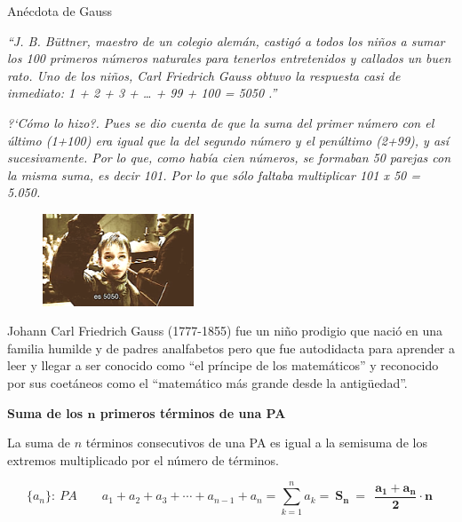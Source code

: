 \begin{myexampleblock}{Anécdota de Gauss}
\begin{multicols}{2}
\emph{``J. B. Büttner, maestro de un colegio alemán, castigó a todos los niños a sumar los 100 primeros números naturales para tenerlos entretenidos y callados un buen rato. Uno de los niños, Carl Friedrich Gauss obtuvo la respuesta casi de inmediato:  1 + 2 + 3 + … + 99 + 100  = 5050 .''}

\vspace{2mm} \emph{?`Cómo lo hizo?. Pues se dio cuenta de que la suma del primer número con el último (1+100) era igual que la del segundo número y el penúltimo (2+99), y así sucesivamente. Por lo que, como había cien números, se formaban 50 parejas con la misma suma, es decir 101. Por lo que sólo faltaba multiplicar 101 x 50 = 5.050.}

\begin{figure}[H]
	\centering
\includegraphics[width=0.4\textwidth]{img-suc/suc08.png}
	\end{figure}
\end{multicols}

\begin{small} \textsf{Johann Carl Friedrich Gauss (1777-1855) fue un niño prodigio que nació en una familia humilde y de padres analfabetos pero que fue autodidacta para aprender a leer y llegar a ser conocido como ``el príncipe de los matemáticos'' y reconocido por sus coetáneos como el ``matemático más grande desde la antigüedad''}.\end{small}
\end{myexampleblock}




\vspace{5mm}\begin{large}\textbf{Suma de los  $\boldsymbol n$  primeros términos de una PA}\end{large}

\vspace{3mm}
\begin{theorem}

La suma de $n$ términos consecutivos de una PA es igual a la semisuma de los extremos multiplicado por el número de términos.

$$\{a_n\}:\ PA \qquad a_1+a_2+a_3+\cdots + a_{n-1}+a_n= \displaystyle \sum_{k=1}^n	a_k = \ \boxed{ \boldsymbol{S_n\ = \ \ \dfrac{a_1+a_n}{2}\cdot n} \ }$$
\end{theorem}

